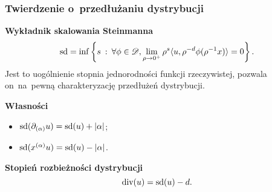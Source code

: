 \documentclass[10pt,t]{beamer}
\newcommand{\divDegree}{\textrm{div}}
\begin{document}
\begin{frame}
  \frametitle{Twierdzenie o~przedłużaniu dystrybucji}


  \textbf{Wykładnik skalowania Steinmanna}
  \begin{equation}
    \label{eq:Epstein-Glaser-03}
    \textrm{sd} =
    \inf \left\{ s \: : \: \forall \phi \in \mathcal{D},
      \lim_{ \rho \to 0^{ + } } \rho^{ s } \langle u, \rho^{ -d } \phi( \rho^{ -1 } x ) \rangle = 0 \right\}.
  \end{equation}
  Jest to uogólnienie stopnia jednorodności funkcji rzeczywistej,
  pozwala on~na~pewną charakteryzację przedłużeń dystrybucji.

  \vspace{\spaceFour}



  \textbf{Własności}
  \begin{itemize}

  \item $\textrm{sd}( \partial_{ ( \alpha ) } u ) = \textrm{sd}( u ) + | \alpha |$;

  \item $\textrm{sd}( x^{ ( \alpha ) } u ) = \textrm{sd}( u ) - | \alpha |$.

  \end{itemize}

  \vspace{\spaceFour}



  \textbf{Stopień rozbieżności dystrybucji} \\
  \begin{equation}
    \divDegree( u ) = \sd( u ) - d.
  \end{equation}

\end{frame}
\end{document}
